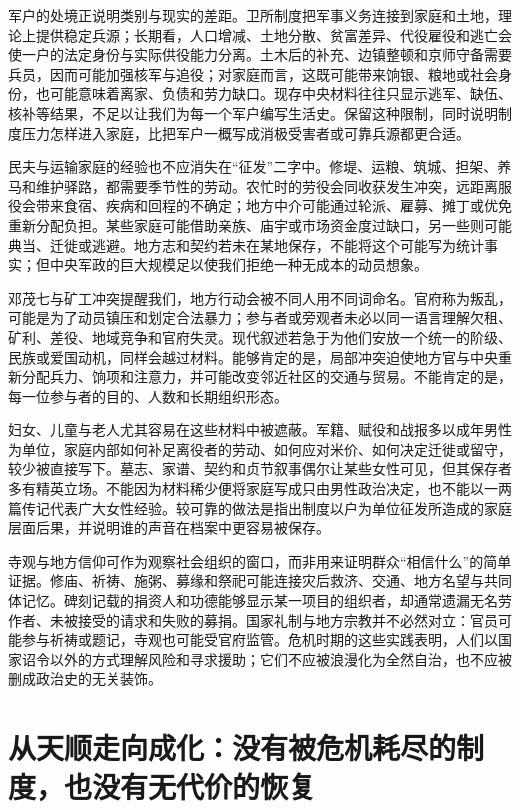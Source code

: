 军户的处境正说明类别与现实的差距。卫所制度把军事义务连接到家庭和土地，理论上提供稳定兵源；长期看，人口增减、土地分散、贫富差异、代役雇役和逃亡会使一户的法定身份与实际供役能力分离。土木后的补充、边镇整顿和京师守备需要兵员，因而可能加强核军与追役；对家庭而言，这既可能带来饷银、粮地或社会身份，也可能意味着离家、负债和劳力缺口。现存中央材料往往只显示逃军、缺伍、核补等结果，不足以让我们为每一个军户编写生活史。保留这种限制，同时说明制度压力怎样进入家庭，比把军户一概写成消极受害者或可靠兵源都更合适。

民夫与运输家庭的经验也不应消失在“征发”二字中。修堤、运粮、筑城、担架、养马和维护驿路，都需要季节性的劳动。农忙时的劳役会同收获发生冲突，远距离服役会带来食宿、疾病和回程的不确定；地方中介可能通过轮派、雇募、摊丁或优免重新分配负担。某些家庭可能借助亲族、庙宇或市场资金度过缺口，另一些则可能典当、迁徙或逃避。地方志和契约若未在某地保存，不能将这个可能写为统计事实；但中央军政的巨大规模足以使我们拒绝一种无成本的动员想象。

邓茂七与矿工冲突提醒我们，地方行动会被不同人用不同词命名。官府称为叛乱，可能是为了动员镇压和划定合法暴力；参与者或旁观者未必以同一语言理解欠租、矿利、差役、地域竞争和官府失灵。现代叙述若急于为他们安放一个统一的阶级、民族或爱国动机，同样会越过材料。能够肯定的是，局部冲突迫使地方官与中央重新分配兵力、饷项和注意力，并可能改变邻近社区的交通与贸易。不能肯定的是，每一位参与者的目的、人数和长期组织形态。

妇女、儿童与老人尤其容易在这些材料中被遮蔽。军籍、赋役和战报多以成年男性为单位，家庭内部如何补足离役者的劳动、如何应对米价、如何决定迁徙或留守，较少被直接写下。墓志、家谱、契约和贞节叙事偶尔让某些女性可见，但其保存者多有精英立场。不能因为材料稀少便将家庭写成只由男性政治决定，也不能以一两篇传记代表广大女性经验。较可靠的做法是指出制度以户为单位征发所造成的家庭层面后果，并说明谁的声音在档案中更容易被保存。

寺观与地方信仰可作为观察社会组织的窗口，而非用来证明群众“相信什么”的简单证据。修庙、祈祷、施粥、募缘和祭祀可能连接灾后救济、交通、地方名望与共同体记忆。碑刻记载的捐资人和功德能够显示某一项目的组织者，却通常遗漏无名劳作者、未被接受的请求和失败的募捐。国家礼制与地方宗教并不必然对立：官员可能参与祈祷或题记，寺观也可能受官府监管。危机时期的这些实践表明，人们以国家诏令以外的方式理解风险和寻求援助；它们不应被浪漫化为全然自治，也不应被删成政治史的无关装饰。

\section{从天顺走向成化：没有被危机耗尽的制度，也没有无代价的恢复}

